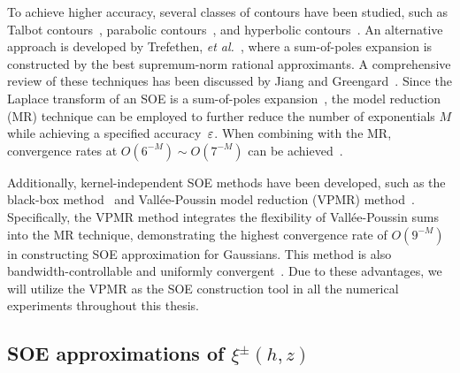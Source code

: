 To achieve higher accuracy, several classes of contours have been studied, such as Talbot contours~\cite{lin2004numerical}, parabolic contours~\cite{makarov2000exponentially}, and hyperbolic contours~\cite{lopez2004numerical}. 
An alternative approach is developed by Trefethen, \emph{et al.}~\cite{trefethen2006talbot}, where a sum-of-poles expansion is constructed by the best supremum-norm rational approximants.
A comprehensive review of these techniques has been discussed by Jiang and Greengard~\cite{jiang2021approximating}.
Since the Laplace transform of an SOE is a sum-of-poles expansion~\cite{greengard2018anisotropic}, the model reduction (MR) technique can be employed to further reduce the number of exponentials $M$ while achieving a specified accuracy~$\varepsilon$.
When combining with the MR, convergence rates at $O(6^{-M}) \sim O(7^{-M})$ can be achieved~\cite{jiang2021approximating}.

Additionally, kernel-independent SOE methods have been developed, such as the black-box method~\cite{greengard2018anisotropic} and Vall\'ee-Poussin model reduction (VPMR) method~\cite{gao2021kernelindependent}. 
Specifically, the VPMR method integrates the flexibility of Vall\'ee-Poussin sums into the MR technique, demonstrating the highest convergence rate of $O(9^{-M})$ in constructing SOE approximation for Gaussians. 
This method is also bandwidth-controllable and uniformly convergent~\cite{AAMM-13-1126}. 
Due to these advantages, we will utilize the VPMR as the SOE construction tool in all the numerical experiments throughout this thesis.




\subsection{SOE approximations of $\xi^{\pm}(h,z)$} \label{subsec::SOEapp}

